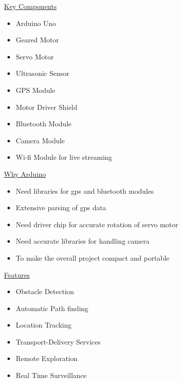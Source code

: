 \documentclass[compress,12pt]{beamer}
\begin{document}
\begin{frame}{\textcolor{cadmiumgreen}{\underline{Key Components}}}
    \begin{itemize}
        \item<1-> [-] Arduino Uno
        \item<2-> [-] Geared Motor
        \item<3-> [-] Servo Motor
        \item<4-> [-] Ultrasonic Sensor
        \item<5-> [-] GPS Module
        \item<6-> [-] Motor Driver Shield
        \item<7-> [-] Bluetooth Module
        \item<8-> [-] Camera Module
        \item<9-> [-] Wi-fi Module for live streaming
    \end{itemize}
\end{frame}

\begin{frame}{\textcolor{cadmiumgreen}{\underline{Why Arduino}}}
    \begin{itemize}
        \item<1-> [-] Need libraries for gps and bluetooth modules
        \item<2-> [-] Extensive parsing of gps data 
        \item<3-> [-] Need driver chip for accurate rotation of servo motor
        \item<4-> [-] Need accurate libraries for handling camera
        \item<5-> [-] To make the overall project compact and portable
    \end{itemize}
\end{frame}

\begin{frame}{\textcolor{cadmiumgreen}{\underline{Features}}}
    \begin{itemize}
        \item<1-> [-] Obstacle Detection
        \item<2-> [-] Automatic Path finding
        \item<3-> [-] Location Tracking
        \item<4-> [-] Transport-Delivery Services
        \item<5-> [-] Remote Exploration
        \item<6-> [-] Real Time Surveillance
    \end{itemize}
\end{frame}
\end{document}
